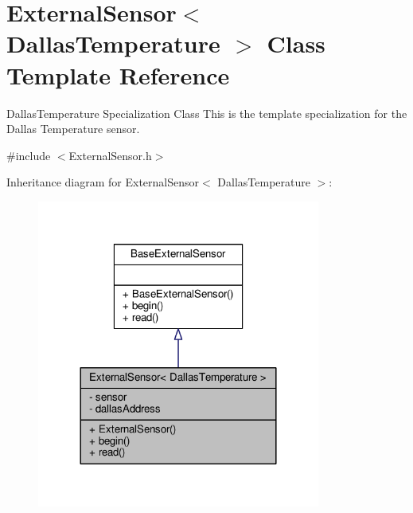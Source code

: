 \hypertarget{class_external_sensor_3_01_dallas_temperature_01_4}{}\section{External\+Sensor$<$ Dallas\+Temperature $>$ Class Template Reference}
\label{class_external_sensor_3_01_dallas_temperature_01_4}


Dallas\+Temperature Specialization Class This is the template specialization for the Dallas Temperature sensor.  




{\ttfamily \#include $<$External\+Sensor.\+h$>$}



Inheritance diagram for External\+Sensor$<$ Dallas\+Temperature $>$\+:\nopagebreak
\begin{figure}[H]
\begin{center}
\leavevmode
\includegraphics[width=264pt]{d4/d74/class_external_sensor_3_01_dallas_temperature_01_4__inherit__graph}
\end{center}
\end{figure}


